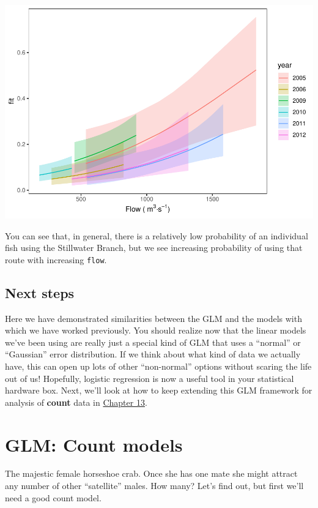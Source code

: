 \documentclass[
]{book}
\begin{document}
\includegraphics{worstr_files/figure-latex/unnamed-chunk-344-1.pdf}

You can see that, in general, there is a relatively low probability of an individual fish using the Stillwater Branch, but we see increasing probability of using that route with increasing \texttt{flow}.

\hypertarget{next12}{%
\section{Next steps}\label{next12}}

Here we have demonstrated similarities between the GLM and the models with which we have worked previously. You should realize now that the linear models we've been using are really just a special kind of GLM that uses a ``normal'' or ``Gaussian'' error distribution. If we think about what kind of data we actually have, this can open up lots of other ``non-normal'' options without scaring the life out of us! Hopefully, logistic regression is now a useful tool in your statistical hardware box. Next, we'll look at how to keep extending this GLM framework for analysis of \textbf{count} data in \protect\hyperlink{Chapter13}{Chapter 13}.

\hypertarget{Chapter13}{%
\chapter{GLM: Count models}\label{Chapter13}}

The majestic female horseshoe crab. Once she has one mate she might attract any number of other ``satellite'' males. How many? Let's find out, but first we'll need a good count model.
\end{document}
